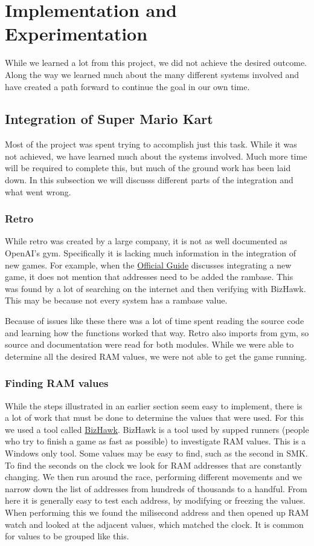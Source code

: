 \section{Implementation and Experimentation}
While we learned a lot from this project, we did not achieve the desired outcome.
Along the way we learned much about the many different systems involved and 
have created a path forward to continue the goal in our own time. 

\subsection{Integration of Super Mario Kart}
Most of the project was spent trying to accomplish just this task. While it was
not achieved, we have learned much about the systems involved. Much more time 
will be required to complete this, but much of the ground work has been laid 
down. In this subsection we will discusss different parts of the integration
and what went wrong.

\subsubsection{Retro}
While retro was created by a large company, it is not as well documented as
OpenAI's gym. Specifically it is lacking much information in the integration
of new games. For example, when the 
\href{https://retro.readthedocs.io/en/latest/integration.html#integrating-a-game}
{Official Guide} discusses integrating a new game, it does not mention that
addresses need to be added the rambase. This was found by a lot of searching
on the internet and then verifying with BizHawk. This may be because not every
system has a rambase value. 

Because of issues like these there was a lot of time spent reading the source
code and learning how the functions worked that way. Retro also imports from
gym, so source and documentation were read for both modules. While we were able
to determine all the desired RAM values, we were not able to get the game running.

\subsubsection{Finding RAM values}
While the steps illustrated in an earlier section seem easy to implement, 
there is a lot of work that must be done to determine the values that were used. 
For this we used a tool called 
\href{https://github.com/TASVideos/BizHawk/}{BizHawk}. BizHawk is a tool
used by supped runners (people who try to finish a game as fast as possible) to 
investigate RAM values. This is a Windows only tool. Some values may be easy to
find, such as the second in SMK. To find the seconds on the clock we look for
RAM addresses that are constantly changing. We then run around the race, performing
different movements and we narrow down the list of addresses from hundreds of 
thousands to a handful. From here it is generally easy to test each address, by
modifying or freezing the values. When performing this we found the milisecond
address and then opened up RAM watch and looked at the adjacent values, which 
matched the clock. It is common for values to be grouped like this. 


